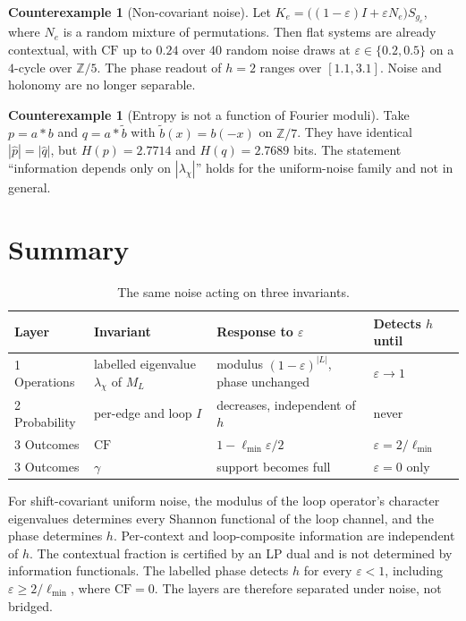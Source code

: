 \documentclass[11pt]{article}
\theoremstyle{definition}
\newtheorem{counterexample}[theorem]{Counterexample}
\theoremstyle{remark}
\newcommand{\Z}{\mathbb{Z}}
\newcommand{\CF}{\mathrm{CF}}
\newcommand{\lmin}{\ell_{\min}}
\begin{document}
\begin{counterexample}[Non-covariant noise]\label{ce:noncov}
Let $K_e=\big((1-\varepsilon)I+\varepsilon N_e\big)S_{g_e}$, where $N_e$ is a random mixture of permutations. Then flat systems are already contextual, with $\CF$ up to $0.24$ over $40$ random noise draws at $\varepsilon\in\{0.2,0.5\}$ on a $4$-cycle over $\Z/5$. The phase readout of $h=2$ ranges over $[1.1,3.1]$. Noise and holonomy are no longer separable.
\end{counterexample}

\begin{counterexample}[Entropy is not a function of Fourier moduli]\label{ce:homometric}
Take $p=a*b$ and $q=a*\tilde b$ with $\tilde b(x)=b(-x)$ on $\Z/7$. They have identical $|\hat p|=|\hat q|$, but $H(p)=2.7714$ and $H(q)=2.7689$ bits. The statement ``information depends only on $|\lambda_\chi|$'' holds for the uniform-noise family and not in general.
\end{counterexample}

\section{Summary}

\begin{table}[h]
\centering
\begin{tabularx}{\linewidth}{@{}l>{\raggedright}X>{\raggedright}X l@{}}
\toprule
Layer & Invariant & Response to $\varepsilon$ & Detects $h$ until\\
\midrule
1 Operations & labelled eigenvalue $\lambda_\chi$ of $M_L$ & modulus $(1-\varepsilon)^{|L|}$, phase unchanged & $\varepsilon\to1$\\
2 Probability & per-edge and loop $I$ & decreases, independent of $h$ & never\\
3 Outcomes & $\CF$ & $1-\lmin\varepsilon/2$ & $\varepsilon=2/\lmin$\\
3 Outcomes & $\gamma$ & support becomes full & $\varepsilon=0$ only\\
\bottomrule
\end{tabularx}
\caption{The same noise acting on three invariants.}
\label{tab:robust}
\end{table}

For shift-covariant uniform noise, the modulus of the loop operator's character eigenvalues determines every Shannon functional of the loop channel, and the phase determines $h$. Per-context and loop-composite information are independent of $h$. The contextual fraction is certified by an LP dual and is not determined by information functionals. The labelled phase detects $h$ for every $\varepsilon<1$, including $\varepsilon\ge2/\lmin$, where $\CF=0$. The layers are therefore separated under noise, not bridged.
\end{document}
